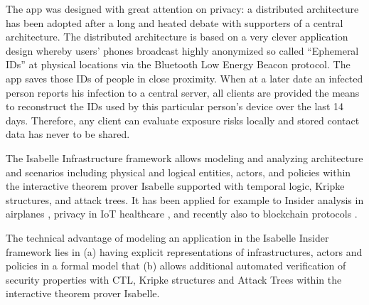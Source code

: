 \documentclass{llncs}
\begin{document}
The app was designed with great
attention on privacy: a distributed architecture \cite{cwa:arch} has been adopted after a long and
heated debate with supporters of a central architecture. The distributed architecture is
based on a very clever application design whereby users' phones broadcast
highly anonymized so called ``Ephemeral IDs'' at physical locations via the
Bluetooth Low Energy Beacon protocol.
The app saves those IDs of people in close proximity.
When at a later date an infected person reports his infection to a central server,
all clients are provided the means to reconstruct the IDs used by this particular
person's device over the last 14 days.
Therefore, any client can evaluate exposure risks locally and stored contact data has never to be shared.
%

The Isabelle Infrastructure framework \cite{kam:20a} allows modeling and analyzing
architecture and scenarios including physical and logical entities, actors, and policies
within the interactive theorem prover Isabelle supported with temporal logic, Kripke
structures, and attack trees. It has been applied for example to Insider analysis in
airplanes \cite{kam:20b}, privacy in IoT healthcare \cite{kam:18b}, and recently also
to blockchain protocols \cite{kn:20}.

The technical advantage of modeling an application in the Isabelle Insider framework lies
in (a) having explicit representations of infrastructures, actors and policies in a
formal model that (b) allows additional automated verification of security properties
with CTL, Kripke structures and Attack Trees within the interactive theorem prover
Isabelle.
\end{document}
